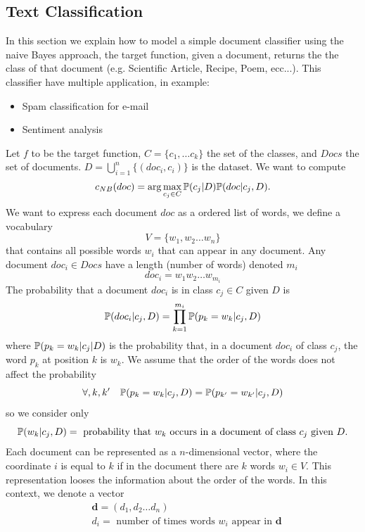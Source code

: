 \documentclass[10pt, letterpaper]{report}
\begin{document}
\subsection{Text Classification}
In this section we explain how to model a simple document classifier using the naive Bayes approach, the target function, given a document, returns the the class of that document (e.g. Scientific Article, Recipe, Poem, ecc...). This classifier have multiple application, in example:\begin{itemize}
    \item Spam classification for e-mail
    \item Sentiment analysis
\end{itemize}
Let $f$ to be the target function, $C=\{c_1,\dots c_k\}$ the set of the classes, and $Docs$ the set of documents. $D=\bigcup_{i=1}^n\{(doc_i,c_i)\}$ is the dataset. We want to compute\begin{equation}
    c_{NB}(doc)=\arg\max_{c_j\in C}{\mathbb P}(c_j|D){\mathbb P}(doc|c_j,D).
\end{equation}
We want to express each document $doc$ as a ordered list of words, we define a vocabulary\begin{equation}
    V=\{w_1,w_2\dots w_n\}
\end{equation}
that contains all possible words $w_i$ that can appear in any document. Any document $doc_i\in Docs$ have a length (number of words) denoted $m_i$\begin{equation}
    doc_i=w_1w_2\dots w_{m_i}
\end{equation}
The probability that a document $doc_i$ is in class $c_j\in C$ given $D$ is\begin{equation}
    {\mathbb P}(doc_i|c_j,D)=\prod_{k=1}^{m_i}{\mathbb P}(p_k=w_k|c_j,D)
\end{equation}
where ${\mathbb P}(p_k=w_k|c_j|D)$ is the probability that, in a document $doc_i$ of class $c_j$, the word $p_k$ at position $k$ is $w_k$. We assume that the order of the words does not affect the probability\begin{equation}
    \forall,k,k' \ \ \ \Prob(p_k=w_k|c_j,D)=\Prob(p_{k'}=w_{k'}|c_j,D)
\end{equation}
so we consider only \begin{equation}
    {\mathbb P}(w_k|c_j,D)=\text{ probability that $w_k$ occurs in a document of class $c_j$ given $D$}.
\end{equation}
Each document can be represented as a $n$-dimensional vector, where the coordinate $i$ is equal to $k$ if in the document there are $k$ words $w_i\in V$. This representation looses the information about the order of the words. In this context, we denote a vector \begin{align}
    &\mathbf d = (d_1,d_2\dots d_n)\\ &d_i = \text{ number of times words $w_i$ appear in $\mathbf d$}
\end{align}
\end{document}
